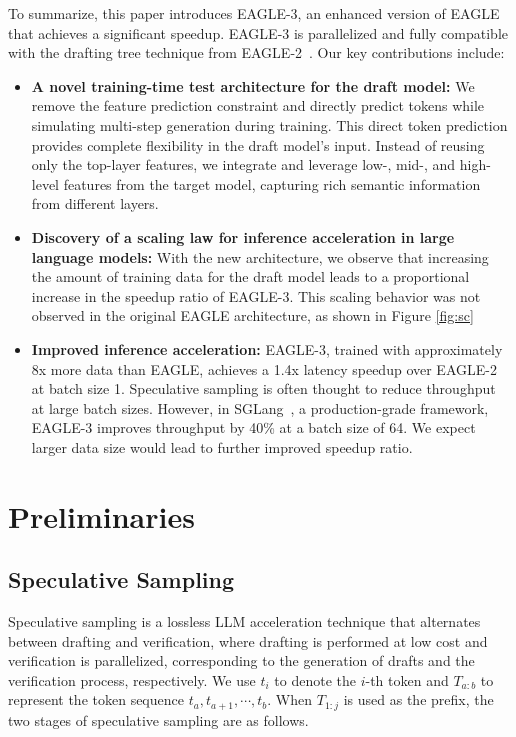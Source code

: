 \documentclass[11pt]{article}
\begin{document}
To summarize, this paper introduces EAGLE-3, an enhanced version of EAGLE that achieves a significant speedup. EAGLE-3 is parallelized and fully compatible with the drafting tree technique from EAGLE-2~\cite{li2024eagle2}. Our key contributions include:
\begin{itemize}
    \item 
    \textbf{A novel training-time test architecture for the draft model:} We remove the feature prediction constraint and directly predict tokens while simulating multi-step generation during training. This direct token prediction provides complete flexibility in the draft model’s input. Instead of reusing only the top-layer features, we integrate and leverage low-, mid-, and high-level features from the target model, capturing rich semantic information from different layers.
    \item
    \textbf{Discovery of a scaling law for inference acceleration in large language models:} With the new architecture, we observe that increasing the amount of training data for the draft model leads to a proportional increase in the speedup ratio of EAGLE-3. This scaling behavior was not observed in the original EAGLE architecture, as shown in Figure \ref{fig:sc}
    \item
    \textbf{Improved inference acceleration:} EAGLE-3, trained with approximately 8x more data than EAGLE, achieves a 1.4x latency speedup over EAGLE-2 at batch size 1. Speculative sampling is often thought to reduce throughput at large batch sizes. However, in SGLang~\cite{zheng2024sglang}, a production-grade framework, EAGLE-3 improves throughput by 40\% at a batch size of 64. We expect larger data size would lead to further improved speedup ratio.
\end{itemize}



\section{Preliminaries}
\subsection{Speculative Sampling}
Speculative sampling \cite{leviathan2023fast,chen2023accelerating,sun2024spectr,sun2024optimal} is a lossless LLM acceleration technique that alternates between drafting and verification, where drafting is performed at low cost and verification is parallelized, corresponding to the generation of drafts and the verification process, respectively. We use $t_i$ to denote the $i$-th token and $T_{a:b}$ to represent the token sequence $t_a, t_{a+1}, \cdots, t_b$. When $T_{1:j}$ is used as the prefix, the two stages of speculative sampling are as follows.
\end{document}
